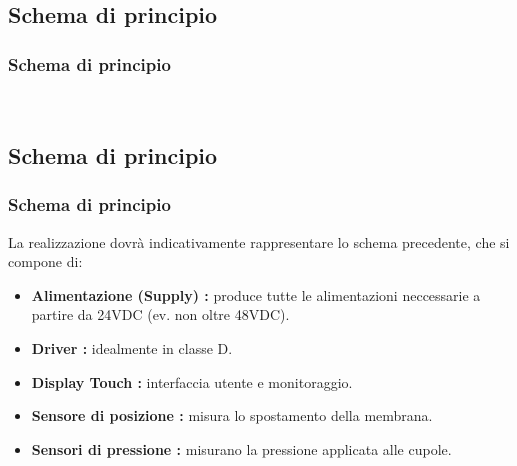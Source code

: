 \subsection{Schema di principio}
\begin{frame}[fragile]
\frametitle{Schema di principio}
\begin{figure}
\centering
{}\
\end{figure}
\end{frame}

\subsection{Schema di principio}
\begin{frame}[fragile]
\frametitle{Schema di principio}
La realizzazione dovrà indicativamente rappresentare lo schema precedente, che si compone di:
\begin{itemize}{}{}
\item \textbf{Alimentazione (Supply) :} produce tutte le alimentazioni neccessarie a partire da 24VDC (ev. non oltre 48VDC).
\item \textbf{Driver :} idealmente in classe D.
\item \textbf{Display Touch :} interfaccia utente e monitoraggio.
\item \textbf{Sensore di posizione :} misura lo spostamento della membrana.
\item \textbf{Sensori di pressione :} misurano la pressione applicata alle cupole.
\end{itemize}
\end{frame}

